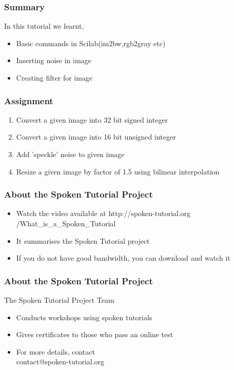 \documentclass[17pt]{beamer}
\begin{document}
\begin{frame}
\frametitle{Summary}
In this tutorial we learnt,
\begin{itemize}[<+-|alert@+>]
\item Basic commands in Scilab(im2bw,rgb2gray etc)
\item Inserting noise in image
\item Creating filter for image
\end{itemize}
\end{frame}

\begin{frame}
\frametitle{Assignment}
\begin{enumerate}
\item Convert a given image into 32 bit signed integer\pause
\item Convert a given image into 16 bit unsigned integer\pause
\item Add 'speckle' noise to given image \pause
\item Resize a given image by factor of 1.5 using bilinear interpolation\pause
\end{enumerate}
\end{frame}


\begin{frame}
  \frametitle{About the Spoken Tutorial Project}
  \begin{itemize}[<+-|alert@+>]
  \item Watch the video available at {\color{blue} http://spoken-tutorial.org
    /What\_is\_a\_Spoken\_Tutorial}
  \item It summarises the Spoken Tutorial project
  \item If you do not have good bandwidth, you can download and watch it
  \end{itemize}
\end{frame}

\begin{frame}[<+-|alert@+>]
  \frametitle{About the Spoken Tutorial Project}
The Spoken Tutorial Project Team
  \begin{itemize}[<+-|alert@+>]
\item Conducts workshops using spoken tutorials
\item Gives certificates to those who pass an online test
\item For more details, contact \\
contact@spoken-tutorial.org
  \end{itemize}
\end{frame}
\end{document}
